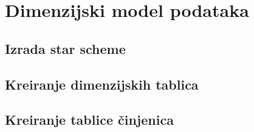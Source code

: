 \section{Dimenzijski model podataka}

\subsection{Izrada star scheme}
\subsection{Kreiranje dimenzijskih tablica}
\subsection{Kreiranje tablice činjenica}